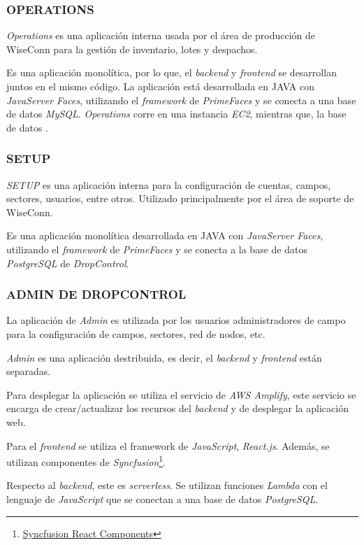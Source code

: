 \subsubsection{OPERATIONS}

\textit{Operations} es una aplicación interna usada por el área de producción de WiseConn para la gestión de inventario, lotes y despachos.

Es una aplicación monolítica, por lo que, el \textit{backend} y \textit{frontend} se desarrollan juntos en el mismo código. La aplicación está desarrollada en JAVA con \textit{JavaServer Faces}, utilizando el \textit{framework} de \textit{PrimeFaces} y se conecta a una base de datos \textit{MySQL}. \textit{Operations} corre en una instancia \textit{EC2}, mientras que, la base de datos .\

\subsubsection{SETUP}

\textit{SETUP} es una aplicación interna para la configuración de cuentas, campos, sectores, usuarios, entre otros. Utilizado principalmente por el área de soporte de WiseConn.

Es una aplicación monolítica desarrollada en JAVA con \textit{JavaServer Faces}, utilizando el \textit{framework} de \textit{PrimeFaces} y se conecta a la base de datos \textit{PostgreSQL} de \textit{DropControl}.

\subsubsection{ADMIN DE DROPCONTROL}

La aplicación de \textit{Admin} es utilizada por los usuarios administradores de campo para la configuración de campos, sectores, red de nodos, etc.

\textit{Admin} es una aplicación destribuida, es decir, el \textit{backend} y \textit{frontend} están separadas.

Para desplegar la aplicación se utiliza el servicio de \textit{AWS Amplify}, este servicio se encarga de crear/actualizar los recursos del \textit{backend} y de desplegar la aplicación web.

Para el \textit{frontend} se utiliza el framework de \textit{JavaScript}, \textit{React.js}. Además, se utilizan componentes de \textit{Syncfusion}\footnote{\href{https://www.syncfusion.com/react-components}{Syncfusion React Components}}.

Respecto al \textit{backend}, este es \textit{serverless}. Se utilizan funciones \textit{Lambda} con el lenguaje de \textit{JavaScript} que se conectan a una base de datos \textit{PostgreSQL}.
\fi